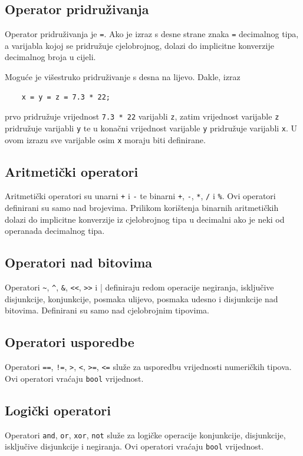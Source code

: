 \documentclass[times, utf8, zavrsni]{fer}
\begin{document}
\subsection{Operator pridruživanja}
Operator pridruživanja je \verb|=|. Ako je izraz s desne strane znaka \verb|=| decimalnog tipa,
a varijabla kojoj se pridružuje cjelobrojnog, dolazi do implicitne konverzije decimalnog broja u cijeli.

Moguće je višestruko pridruživanje s desna na lijevo. Dakle, izraz
\begin{verbatim}
    x = y = z = 7.3 * 22;
\end{verbatim}
prvo pridružuje vrijednost \verb|7.3 * 22| varijabli \verb|z|, zatim vrijednost varijable \verb|z| pridružuje varijabli \verb|y| te u konačni
vrijednost varijable \verb|y| pridružuje varijabli \verb|x|. U ovom izrazu sve varijable osim \verb|x| moraju biti definirane.

\subsection{Aritmetički operatori}
Aritmetički operatori su unarni \verb|+| i \verb|-| te binarni \verb|+|, \verb|-|, \verb|*|, \verb|/| i \verb|%|. Ovi operatori definirani su samo
nad brojevima. Prilikom korištenja binarnih aritmetičkih dolazi do implicitne konverzije iz cjelobrojnog tipa u decimalni ako je neki od operanada decimalnog 
tipa.

\subsection{Operatori nad bitovima}
Operatori \verb|~|, \verb|^|, \verb|&|, \verb|<<|, \verb|>>| i \verb||| definiraju redom operacije negiranja, isključive disjunkcije, konjunkcije, posmaka ulijevo, posmaka udesno i disjunkcije nad bitovima.
Definirani su samo nad cjelobrojnim tipovima.

\subsection{Operatori usporedbe}
Operatori \verb|==|, \verb|!=|, \verb|>|, \verb|<|, \verb|>=|, \verb|<=| služe za usporedbu vrijednosti numeričkih tipova. Ovi operatori vraćaju \verb|bool| vrijednost.

\subsection{Logički operatori}
Operatori \verb|and|, \verb|or|, \verb|xor|, \verb|not| služe za logičke operacije konjunkcije, disjunkcije, isključive disjunkcije i negiranja.
Ovi operatori vraćaju \verb|bool| vrijednost.
\end{document}
